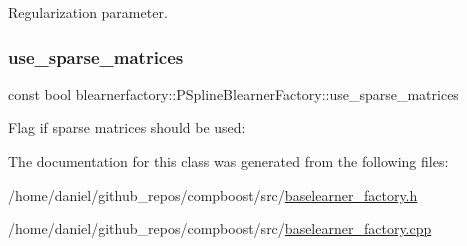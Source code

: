 Regularization parameter. 

\mbox{\label{classblearnerfactory_1_1_p_spline_blearner_factory_a5c2cfba00d48a4b85af6f1ecd714c6a1}} 
\subsubsection{\texorpdfstring{use\+\_\+sparse\+\_\+matrices}{use\_sparse\_matrices}}
{\footnotesize\ttfamily const bool blearnerfactory\+::\+P\+Spline\+Blearner\+Factory\+::use\+\_\+sparse\+\_\+matrices\hspace{0.3cm}{\ttfamily [private]}}



Flag if sparse matrices should be used\+: 



The documentation for this class was generated from the following files\+:\begin{DoxyCompactItemize}
\item 
/home/daniel/github\+\_\+repos/compboost/src/\hyperlink{baselearner__factory_8h}{baselearner\+\_\+factory.\+h}\item 
/home/daniel/github\+\_\+repos/compboost/src/\hyperlink{baselearner__factory_8cpp}{baselearner\+\_\+factory.\+cpp}\end{DoxyCompactItemize}
